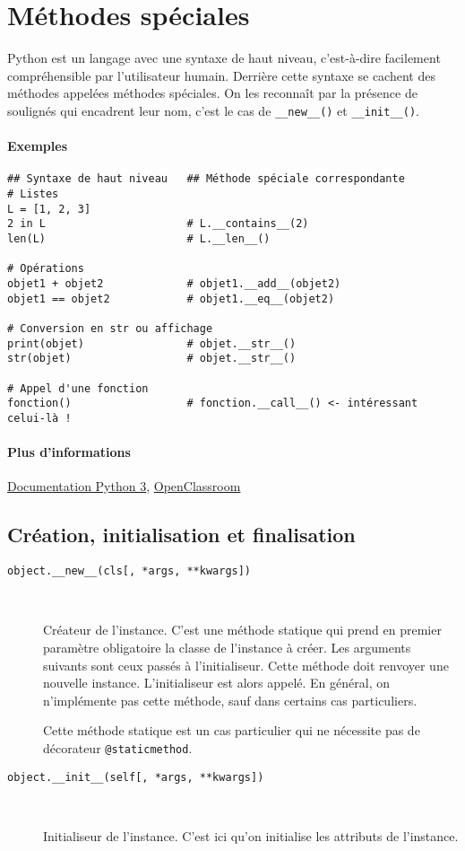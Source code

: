\section{Méthodes spéciales}
Python est un langage avec une syntaxe de haut niveau, c'est-à-dire facilement compréhensible par l'utilisateur humain. Derrière cette syntaxe se cachent des méthodes appelées méthodes spéciales. On les reconnaît par la présence de soulignés qui encadrent leur nom, c'est le cas de \texttt{__new__()} et \texttt{__init__()}.

\paragraph{Exemples}
\begin{verbatim}
## Syntaxe de haut niveau   ## Méthode spéciale correspondante
# Listes
L = [1, 2, 3]
2 in L                      # L.__contains__(2)
len(L)                      # L.__len__()

# Opérations
objet1 + objet2             # objet1.__add__(objet2)
objet1 == objet2            # objet1.__eq__(objet2)

# Conversion en str ou affichage
print(objet)                # objet.__str__()
str(objet)                  # objet.__str__()

# Appel d'une fonction
fonction()                  # fonction.__call__() <- intéressant celui-là !
\end{verbatim}

\paragraph{Plus d'informations} \href{https://docs.python.org/3/reference/datamodel.html#specialnames}{Documentation Python 3}, \href{https://openclassrooms.com/courses/apprenez-a-programmer-en-python/les-methodes-speciales-1}{OpenClassroom}


\subsection{Création, initialisation et finalisation}
\begin{description}
    \item[\texttt{object.__new__(cls[, *args, **kwargs])}]~

    Créateur de l'instance. C'est une méthode statique qui prend en premier paramètre obligatoire la classe de l'instance à créer. Les arguments suivants sont ceux passés à l'initialiseur. Cette méthode doit renvoyer une nouvelle instance. L'initialiseur est alors appelé. En général, on n'implémente pas cette méthode, sauf dans certains cas particuliers.\bigskip

    Cette méthode statique est un cas particulier qui ne nécessite pas de décorateur \texttt{@staticmethod}.

    \item[\texttt{object.__init__(self[, *args, **kwargs])}]~

    Initialiseur de l'instance. C'est ici qu'on initialise les attributs de l'instance.
\end{description}

